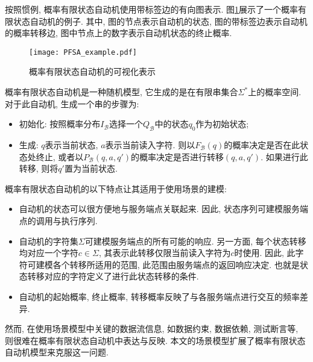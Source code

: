             按照惯例, 概率有限状态自动机使用带标签边的有向图表示. 图\ref{fig:PFSA_example}展示了一个概率有限状态自动机的例子. 其中, 图的节点表示自动机的状态, 图的带标签边表示自动机的概率转移边, 图中节点上的数字表示自动机状态的终止概率.
            
            \begin{figure}[!htb]
                \centering
                \texttt{[image: PFSA\_example.pdf]}
                \caption{概率有限状态自动机的可视化表示}
                \label{fig:PFSA_example}
            \end{figure}
            
            概率有限状态自动机是一种随机模型, 它生成的是在有限串集合$\Sigma^{*}$上的概率空间. 对于此自动机, 生成一个串的步骤为:
            
            \begin{itemize}
                \item 初始化: 按照概率分布$I_\mathcal{B}$选择一个$Q_{\mathcal{B}}$中的状态$q_0$作为初始状态;
                
                \item 生成: $q$表示当前状态, $a$表示当前读入字符. 则以$F_{\mathcal{B}}(q)$的概率决定是否在此状态处终止, 或者以$P_{\mathcal{B}}(q, a, q')$的概率决定是否进行转移$(q,a,q')$. 如果进行此转移, 则将$q'$置为当前状态.
            \end{itemize}
        
            概率有限状态自动机的以下特点让其适用于使用场景的建模:
            
            \begin{itemize}
                \item 自动机的状态可以很方便地与服务端点关联起来. 因此, 状态序列可建模服务端点的调用与执行序列.
                
                \item 自动机的字符集$\Sigma$可建模服务端点的所有可能的响应. 另一方面, 每个状态转移均对应一个字符$c \in \Sigma$, 其表示此转移仅限当前读入字符为$c$时使用. 因此, 此字符可建模各个转移所适用的范围, 此范围由服务端点的返回响应决定. 也就是状态转移对应的字符定义了进行此状态转移的条件.
                
                \item 自动机的起始概率, 终止概率, 转移概率反映了与各服务端点进行交互的频率差异.
            \end{itemize}
            
            然而, 在使用场景模型中关键的数据流信息, 如数据约束, 数据依赖, 测试断言等, 则很难在概率有限状态自动机中表达与反映. 本文的场景模型扩展了概率有限状态自动机模型来克服这一问题.
        
